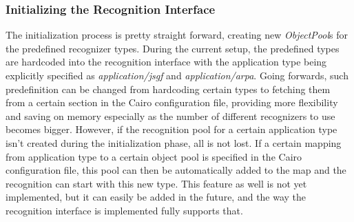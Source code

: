 

\subsubsection{Initializing the Recognition Interface}
The initialization process is pretty straight forward, creating new \textit{ObjectPool}s for the predefined recognizer types.
During the current setup, the predefined types are hardcoded into the recognition interface with the application type being explicitly specified as \textit{application/jsgf} and \textit{application/arpa}.
Going forwards, such predefinition can be changed from hardcoding certain types to fetching them from a certain section in the Cairo configuration file, providing more flexibility and saving on memory especially as the number of different recognizers to use becomes bigger.
However, if the recognition pool for a certain application type isn't created during the initialization phase, all is not lost.
If a certain mapping from application type to a certain object pool is specified in the Cairo configuration file, this pool can then be automatically added to the map and the recognition can start with this new type.
This feature as well is not yet implemented, but it can easily be added in the future, and the way the recognition interface is implemented fully supports that.


